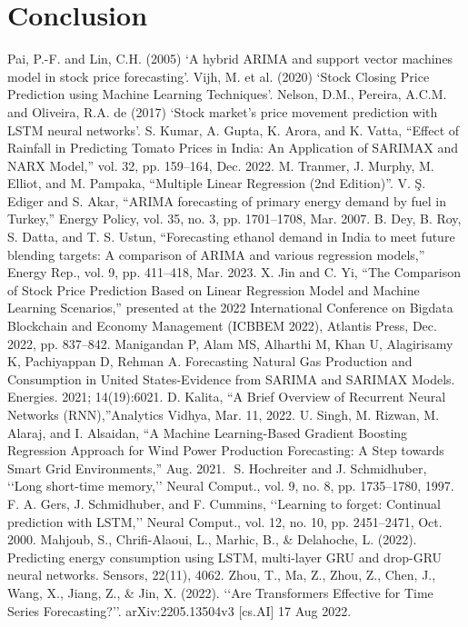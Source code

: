 \documentclass{ieeeojies}
\begin{document}
\section{Conclusion}

\begin{thebibliography}{00}
     Pai, P.-F. and Lin, C.H. (2005) ‘A hybrid ARIMA and support vector machines model in stock price forecasting’.
     Vijh, M. et al. (2020) ‘Stock Closing Price Prediction using Machine Learning Techniques’.
    Nelson, D.M., Pereira, A.C.M. and Oliveira, R.A. de (2017) ‘Stock market’s price movement prediction with LSTM neural networks’.
    S. Kumar, A. Gupta, K. Arora, and K. Vatta, “Effect of Rainfall in Predicting Tomato Prices in India: An Application of SARIMAX and NARX Model,” vol. 32, pp. 159–164, Dec. 2022.
    M. Tranmer, J. Murphy, M. Elliot, and M. Pampaka, “Multiple Linear Regression (2nd Edition)”.
    V. Ş. Ediger and S. Akar, “ARIMA forecasting of primary energy demand by fuel in Turkey,” Energy Policy, vol. 35, no. 3, pp. 1701–1708, Mar. 2007.
    B. Dey, B. Roy, S. Datta, and T. S. Ustun, “Forecasting ethanol demand in India to meet future blending targets: A comparison of ARIMA and various regression models,” Energy Rep., vol. 9, pp. 411–418, Mar. 2023.
    X. Jin and C. Yi, “The Comparison of Stock Price Prediction Based on Linear Regression Model and Machine Learning Scenarios,” presented at the 2022 International Conference on Bigdata Blockchain and Economy Management (ICBBEM 2022), Atlantis Press, Dec. 2022, pp. 837–842.
    Manigandan P, Alam MS, Alharthi M, Khan U, Alagirisamy K, Pachiyappan D, Rehman A. Forecasting Natural Gas Production and Consumption in United States-Evidence from SARIMA and SARIMAX Models. Energies. 2021; 14(19):6021.
    D. Kalita, “A Brief Overview of Recurrent Neural Networks (RNN),”Analytics Vidhya, Mar. 11, 2022.
    U. Singh, M. Rizwan, M. Alaraj, and I. Alsaidan, “A Machine Learning-Based Gradient Boosting Regression Approach for Wind Power Production Forecasting: A Step towards Smart Grid Environments,” Aug. 2021.
    ‌ S. Hochreiter and J. Schmidhuber, ‘‘Long short-time memory,’’ Neural Comput., vol. 9, no. 8, pp. 1735–1780, 1997.
    F. A. Gers, J. Schmidhuber, and F. Cummins, ‘‘Learning to forget:
    Continual prediction with LSTM,’’ Neural Comput., vol. 12, no. 10, pp. 2451–2471, Oct. 2000.
    Mahjoub, S., Chrifi-Alaoui, L., Marhic, B., \& Delahoche, L. (2022). Predicting energy consumption using LSTM, multi-layer GRU and drop-GRU neural networks. Sensors, 22(11), 4062.
    Zhou, T., Ma, Z., Zhou, Z., Chen, J., Wang, X., Jiang, Z., \& Jin, X. (2022).
    ‘‘Are Transformers Effective for Time Series Forecasting?’’. arXiv:2205.13504v3 [cs.AI] 17 Aug 2022.

\end{thebibliography}
\EOD
\end{document}
